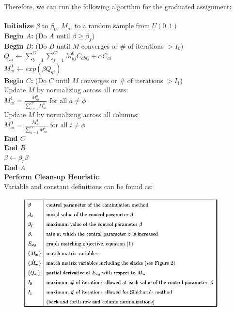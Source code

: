 Therefore, we can run the following algorithm for the graduated assignment:\\
\\
\textbf{Initialize} $\beta$ to $\beta_{0}$, $M_{ai}$ to a random sample from $U(0,1)$\\
\textbf{Begin $A$:} (Do $A$ until $\beta \geq \beta_{f}$)\\
\indent \textbf{Begin $B$:} (Do $B$ until $M$ converges or \# of iterations $>I_0$)\\
\indent $Q_{ai} \leftarrow \sum_{b=1}^{G}\sum_{j=1}^{G'}M_{bj}^{0}C_{abij}+\alpha C_{ai}$\\
\indent $M_{ai}^{0} \leftarrow exp(\beta Q_{qi})$\\
\indent \indent \textbf{Begin $C$:} (Do $C$ until $M$ converges or \# of iterations $>I_1$)\\
\indent \indent  Update $M$ by normalizing across all rows:\\
\indent \indent  $M_{ai}^{1}=\frac{M_{ai}^{0}}{\sum_{i=1}^{G'}M_{ai}^{0}}$ for all $a\neq\phi$\\
\indent \indent  Update $M$ by normalizing across all columns:\\
\indent \indent  $M_{ai}^{0}=\frac{M_{ai}^{1}}{\sum_{a=1}^{G}M_{ai}^{1}}$ for all $i\neq\phi$\\
\indent \indent \textbf{End $C$}\\
\indent \textbf{End $B$}\\
$\beta\leftarrow\beta_{r}\beta$\\
\textbf{End $A$}\\
\textbf{Perform Clean-up Heuristic}\\

Variable and constant definitions can be found as:
\begin{figure}[h]
	\centering
	\captionsetup{justification=centering}
	\includegraphics[width=0.95\textwidth]{figs/algorithm_variable.png}
\end{figure}

